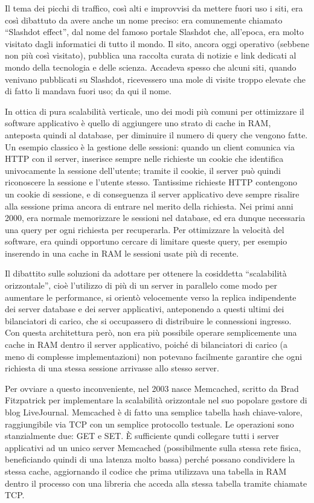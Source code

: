 Il tema dei picchi di traffico, così alti e improvvisi da mettere fuori uso i siti,
era così dibattuto da avere anche un nome preciso: era comunemente chiamato ``Slashdot
effect'', dal nome del famoso portale Slashdot che, all'epoca, era molto visitato dagli
informatici di tutto il mondo. Il sito, ancora oggi operativo (sebbene non più così
visitato), pubblica una raccolta curata di notizie e link dedicati al mondo della tecnologia
e delle scienza. Accadeva spesso che alcuni siti, quando venivano pubblicati su Slashdot,
ricevessero una mole di visite troppo elevate che di fatto li mandava fuori uso; da qui
il nome.

In ottica di pura scalabilità verticale, uno dei modi più comuni per ottimizzare il software
applicativo è quello di aggiungere uno strato di cache in RAM, anteposta quindi al database,
per diminuire il numero di query che vengono fatte. Un esempio classico è la gestione delle
sessioni: quando un client comunica via HTTP con il server, inserisce sempre nelle richieste
un cookie che identifica univocamente la sessione dell'utente; tramite il cookie, il server
può quindi riconoscere la sessione e l'utente stesso. Tantissime richieste HTTP contengono un
cookie di sessione, e di conseguenza il server applicativo deve sempre risalire alla sessione
prima ancora di entrare nel merito della richiesta. Nei primi anni 2000, era normale memorizzare
le sessioni nel database, ed era dunque necessaria una query per ogni richiesta per recuperarla.
Per ottimizzare la velocità del software, era quindi opportuno cercare di limitare queste query, per esempio inserendo in una cache in RAM le sessioni usate più di recente.

Il dibattito sulle soluzioni da adottare per ottenere la cosiddetta ``scalabilità orizzontale'',
cioè l'utilizzo di più di un server in parallelo come modo per aumentare le performance,
si orientò velocemente verso la replica indipendente dei server database
e dei server applicativi, anteponendo a questi ultimi dei bilanciatori di carico, che
si occupassero di distribuire le connessioni ingresso. Con questa architettura però,
non era più possibile operare semplicemente una cache in RAM dentro il server applicativo, poiché di bilanciatori di carico (a meno di complesse implementazioni) non potevano facilmente garantire
che ogni richiesta di una stessa sessione arrivasse allo stesso server.

Per ovviare a questo inconveniente, nel 2003 nasce Memcached, scritto da Brad Fitzpatrick per implementare la scalabilità orizzontale nel suo popolare gestore di blog LiveJournal.
Memcached è di fatto una semplice tabella hash chiave-valore, raggiungibile via TCP con un
semplice protocollo testuale. Le operazioni sono stanzialmente due: GET e SET. È sufficiente
qundi collegare tutti i server applicativi ad un unico server Memcached (possibilmente
sulla stessa rete fisica, beneficiando quindi di una latenza molto bassa) perché possano
condividere la stessa cache, aggiornando il codice che prima utilizzava una tabella in RAM
dentro il processo con una libreria che acceda alla stessa tabella tramite chiamate TCP.

